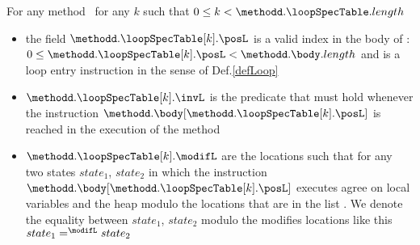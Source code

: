 For any method \methodd \ for any $ k $ such that $ 0 \leq k < \methodd.\loopSpecTable.length$ 
          \begin{itemize}
                \item the field $\methodd.\loopSpecTable[k].\posL$ is a valid index in the body of \methodd:\\
                      $ 0 \leq   \methodd.\loopSpecTable[k].\posL < \methodd.\body.length$ and is a loop entry
                      instruction in the sense of Def.\ref{defLoop}

	        \item $\methodd.\loopSpecTable[k].\invL$ is the predicate that must hold whenever the instruction 
		      $\methodd.\body[ \methodd.\loopSpecTable[k].\posL]$ 
                      is  reached in the execution of the method \methodd

                \item $\methodd.\loopSpecTable[k].\modifL$ are the locations such that for any two states
                      $state_1$, $state_2 $  in which the instruction $\methodd.\body[ \methodd.\loopSpecTable[k].\posL]$ 
		      executes agree on local variables and the heap modulo the locations that are in the list \modifL.
                      We denote the equality between  $state_1$, $ state_2 $   modulo the modifies locations like this 
                      $ state_1 =^{\modifL} state_2$
	  \end{itemize}
